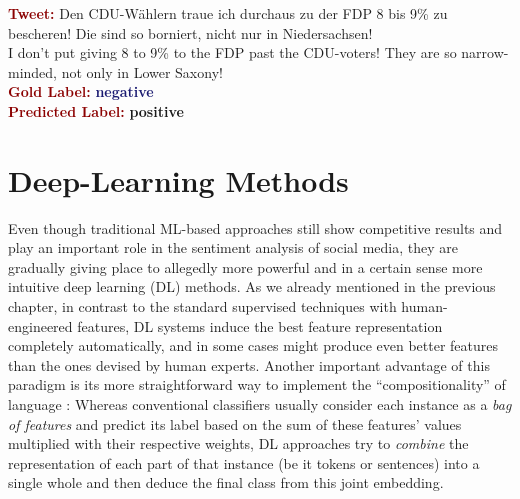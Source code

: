 \begin{example}\label{snt:cgsa:exmp:guenther-error}
  \noindent\textup{\bfseries\textcolor{darkred}{Tweet:}} {\upshape Den CDU-W\"ahlern traue ich durchaus zu der FDP 8 bis 9\% zu bescheren! Die sind so borniert, nicht nur in Niedersachsen!}\\
  \noindent I don't put giving 8 to 9\% to the FDP past the CDU-voters!  They are so narrow-minded, not only in Lower Saxony!\\[\exampleSep]
  \noindent\textup{\bfseries\textcolor{darkred}{Gold Label:}}\hspace*{4.3em}\textbf{%
    \upshape\textcolor{midnightblue}{negative}}\\
 \noindent\textup{\bfseries\textcolor{darkred}{Predicted Label:}}\hspace*{2em}\textbf{%
    \upshape\textcolor{green3}{positive}}
\end{example}


\section{Deep-Learning Methods}\label{sec:cgsa:dl-based}

Even though traditional ML-based approaches still show competitive
results and play an important role in the sentiment analysis of social
media, they are gradually giving place to allegedly more powerful and
in a certain sense more intuitive deep learning (DL) methods.  As we
already mentioned in the previous chapter, in contrast to the standard
supervised techniques with human-engineered features, DL systems
induce the best feature representation completely automatically, and
in some cases might produce even better features than the ones devised
by human experts.  Another important advantage of this paradigm is its
more straightforward way to implement the ``compositionality'' of
language \cite{Frege:1892}: Whereas conventional classifiers usually
consider each instance as a \emph{bag of features} and predict its
label based on the sum of these features' values multiplied with their
respective weights, DL approaches try to \emph{combine} the
representation of each part of that instance (be it tokens or
sentences) into a single whole and then deduce the final class from
this joint embedding.

